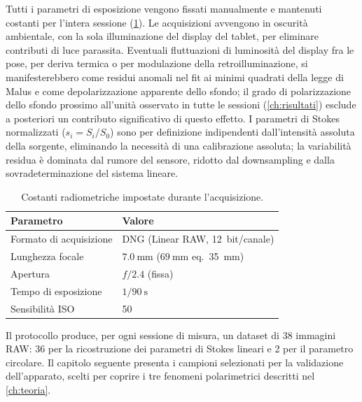 Tutti i parametri di esposizione vengono fissati manualmente e mantenuti costanti per l'intera sessione (\cref{tab:costanti-radiometriche}). Le acquisizioni avvengono in oscurità ambientale, con la sola illuminazione del display del tablet, per eliminare contributi di luce parassita. Eventuali fluttuazioni di luminosità del display fra le pose, per deriva termica o per modulazione della retroilluminazione, si manifesterebbero come residui anomali nel fit ai minimi quadrati della legge di Malus e come depolarizzazione apparente dello sfondo; il grado di polarizzazione dello sfondo prossimo all'unità osservato in tutte le sessioni (\cref{ch:risultati}) esclude a posteriori un contributo significativo di questo effetto. I parametri di Stokes normalizzati ($s_i = S_i/S_0$) sono per definizione indipendenti dall'intensità assoluta della sorgente, eliminando la necessità di una calibrazione assoluta; la variabilità residua è dominata dal rumore del sensore, ridotto dal downsampling e dalla sovradeterminazione del sistema lineare.

\begin{table}[H]
    \centering
    \caption{Costanti radiometriche impostate durante l'acquisizione.}
    \label{tab:costanti-radiometriche}
    \begin{tabular}{ll}
        \hline
        \textbf{Parametro} & \textbf{Valore} \\
        \hline
        Formato di acquisizione & DNG (Linear RAW, 12~bit/canale) \\
        Lunghezza focale & $\SI{7.0}{\milli\meter}$ ($\SI{69}{\milli\meter}$ eq.\ 35~mm) \\
        Apertura & $f/2.4$ (fissa) \\
        Tempo di esposizione & $1/\SI{90}{\second}$ \\
        Sensibilità ISO & 50 \\
        \hline
    \end{tabular}
\end{table}

Il protocollo produce, per ogni sessione di misura, un dataset di 38 immagini RAW: 36 per la ricostruzione dei parametri di Stokes lineari e 2 per il parametro circolare. Il capitolo seguente presenta i campioni selezionati per la validazione dell'apparato, scelti per coprire i tre fenomeni polarimetrici descritti nel \cref{ch:teoria}.

